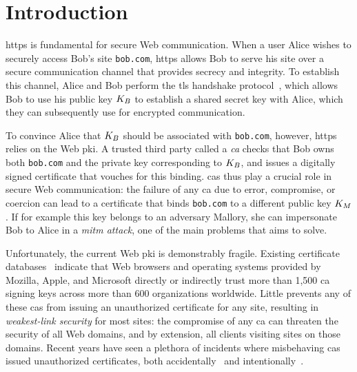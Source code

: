 \section{Introduction}
\label{sec:intro}

\acs{https} is fundamental for secure Web communication. When a user Alice
wishes to securely access Bob's site \texttt{bob.com}, \ac{https} allows Bob to
serve his site over a secure communication channel that provides secrecy and
integrity. To establish this channel, Alice and Bob perform the \ac{tls}
handshake protocol~\cite{rfc8446}, which allows Bob to use his public key
$K_B$ to establish a shared secret key with Alice, which they can subsequently
use for encrypted communication.

To convince Alice that $K_B$ should be associated with \texttt{bob.com},
however, \ac{https} relies on the Web \ac{pki}. A trusted third party called a
\emph{\ac{ca}} checks that Bob owns both \texttt{bob.com} and the private key
corresponding to $K_B$, and
issues a digitally signed certificate that vouches for this binding. \acp{ca}
thus play a crucial role in secure Web communication: the failure of any \ac{ca}
due to error, compromise, or coercion can lead to a certificate that binds
\texttt{bob.com} to a different public key $K_M$. If for example this key
belongs to an adversary Mallory, she can impersonate Bob to Alice in a
\emph{\ac{mitm} attack}, one of the main problems that  aims to solve.

Unfortunately, the current Web \ac{pki} is demonstrably fragile. Existing
certificate databases~\cite{durumeric2015search, rfc6962} indicate that Web
browsers and operating systems provided by Mozilla, Apple, and Microsoft
directly or indirectly trust more than 1,500 \ac{ca} signing keys across more
than 600 organizations worldwide. Little prevents any
of these \acp{ca} from issuing an unauthorized certificate for any site,
resulting in \emph{weakest-link security} for most sites: the compromise of any
\ac{ca} can threaten the security of all Web domains, and by extension, all
clients visiting sites on those domains. Recent years have seen a plethora of
incidents where misbehaving \acp{ca} issued unauthorized certificates, both
accidentally~\cite{sleevi2015sustaining} and
intentionally~\cite{valsorda2015komodia}.

